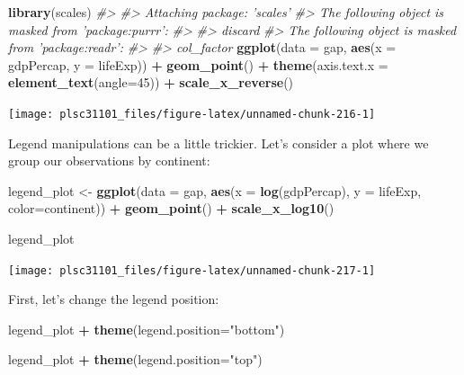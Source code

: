 \documentclass[]{book}
\newenvironment{Shaded}{\begin{snugshade}}{\end{snugshade}}
\newcommand{\KeywordTok}[1]{\textcolor[rgb]{0.13,0.29,0.53}{\textbf{#1}}}
\newcommand{\DataTypeTok}[1]{\textcolor[rgb]{0.13,0.29,0.53}{#1}}
\newcommand{\DecValTok}[1]{\textcolor[rgb]{0.00,0.00,0.81}{#1}}
\newcommand{\StringTok}[1]{\textcolor[rgb]{0.31,0.60,0.02}{#1}}
\newcommand{\CommentTok}[1]{\textcolor[rgb]{0.56,0.35,0.01}{\textit{#1}}}
\newcommand{\OperatorTok}[1]{\textcolor[rgb]{0.81,0.36,0.00}{\textbf{#1}}}
\newcommand{\NormalTok}[1]{#1}
\begin{document}
\begin{Shaded}
\begin{Highlighting}[]
\KeywordTok{library}\NormalTok{(scales)}
\CommentTok{#> }
\CommentTok{#> Attaching package: 'scales'}
\CommentTok{#> The following object is masked from 'package:purrr':}
\CommentTok{#> }
\CommentTok{#>     discard}
\CommentTok{#> The following object is masked from 'package:readr':}
\CommentTok{#> }
\CommentTok{#>     col_factor}
\KeywordTok{ggplot}\NormalTok{(}\DataTypeTok{data =}\NormalTok{ gap, }\KeywordTok{aes}\NormalTok{(}\DataTypeTok{x =}\NormalTok{ gdpPercap, }\DataTypeTok{y =}\NormalTok{ lifeExp)) }\OperatorTok{+}
\StringTok{  }\KeywordTok{geom_point}\NormalTok{() }\OperatorTok{+}
\StringTok{  }\KeywordTok{theme}\NormalTok{(}\DataTypeTok{axis.text.x =} \KeywordTok{element_text}\NormalTok{(}\DataTypeTok{angle=}\DecValTok{45}\NormalTok{)) }\OperatorTok{+}
\StringTok{  }\KeywordTok{scale_x_reverse}\NormalTok{()}
\end{Highlighting}
\end{Shaded}

\begin{center}\texttt{[image: plsc31101\_files/figure-latex/unnamed-chunk-216-1]} \end{center}

Legend manipulations can be a little trickier. Let's consider a plot
where we group our observations by continent:

\begin{Shaded}
\begin{Highlighting}[]
\NormalTok{legend_plot <-}\StringTok{ }\KeywordTok{ggplot}\NormalTok{(}\DataTypeTok{data =}\NormalTok{ gap, }\KeywordTok{aes}\NormalTok{(}\DataTypeTok{x =} \KeywordTok{log}\NormalTok{(gdpPercap), }\DataTypeTok{y =}\NormalTok{ lifeExp, }\DataTypeTok{color=}\NormalTok{continent)) }\OperatorTok{+}
\StringTok{  }\KeywordTok{geom_point}\NormalTok{() }\OperatorTok{+}\StringTok{ }
\StringTok{  }\KeywordTok{scale_x_log10}\NormalTok{()}

\NormalTok{legend_plot}
\end{Highlighting}
\end{Shaded}

\begin{center}\texttt{[image: plsc31101\_files/figure-latex/unnamed-chunk-217-1]} \end{center}

First, let's change the legend position:

\begin{Shaded}
\begin{Highlighting}[]
\NormalTok{legend_plot }\OperatorTok{+}\StringTok{ }
\StringTok{  }\KeywordTok{theme}\NormalTok{(}\DataTypeTok{legend.position=}\StringTok{"bottom"}\NormalTok{)}

\NormalTok{legend_plot }\OperatorTok{+}\StringTok{ }
\StringTok{  }\KeywordTok{theme}\NormalTok{(}\DataTypeTok{legend.position=}\StringTok{"top"}\NormalTok{)}
\end{Highlighting}
\end{Shaded}
\end{document}
